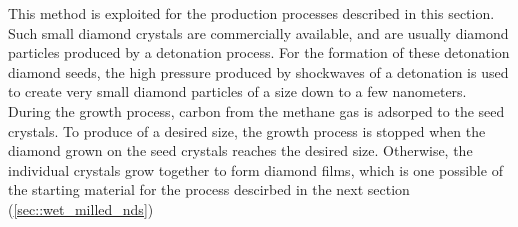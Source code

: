 	This method is exploited for the production processes described in this section.
	Such small diamond crystals are commercially available, and are usually diamond particles produced by a detonation process.
	For the formation of these detonation diamond seeds, the high pressure produced by shockwaves of a detonation is used to create very small diamond particles of a size down to a few nanometers.
	During the \CVD growth process, carbon from the methane gas is adsorped to the seed crystals.
	To produce \nds of a desired size, the growth process is stopped when the diamond grown on the seed crystals reaches the desired size. 
	Otherwise, the individual crystals grow together to form diamond films, which is one possible of the starting material for the process descirbed in the next section (\autoref{sec::wet_milled_nds})
	\\



